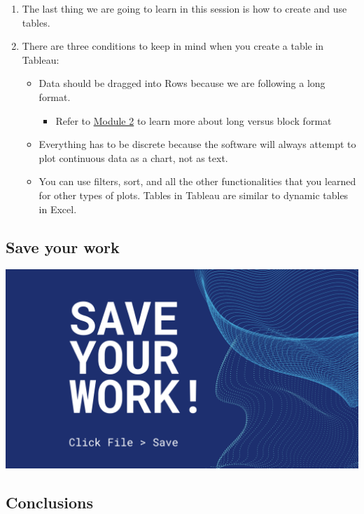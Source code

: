 \documentclass[
]{book}
\providecommand{\tightlist}{%
  \setlength{\itemsep}{0pt}\setlength{\parskip}{0pt}}
\begin{document}
\begin{enumerate}
\def\labelenumi{\arabic{enumi}.}
\tightlist
\item
  The last thing we are going to learn in this session is how to create and use tables.
\item
  There are three conditions to keep in mind when you create a table in Tableau:

  \begin{itemize}
  \tightlist
  \item
    Data should be dragged into Rows because we are following a long format.

    \begin{itemize}
    \tightlist
    \item
      Refer to \protect\hyperlink{data-cleaning-best-practices}{Module 2} to learn more about long versus block format
    \end{itemize}
  \item
    Everything has to be discrete because the software will always attempt to plot continuous data as a chart, not as text.
  \item
    You can use filters, sort, and all the other functionalities that you learned for other types of plots. Tables in Tableau are similar to dynamic tables in Excel.
  \end{itemize}
\end{enumerate}

\hypertarget{save-your-work}{%
\subsection{Save your work}\label{save-your-work}}

\includegraphics{images/M3S3-save-work.png}

\hypertarget{conclusions}{%
\subsection{Conclusions}\label{conclusions}}
\end{document}
